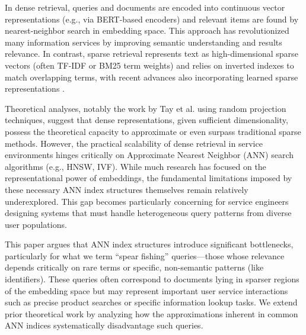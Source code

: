 \documentclass[conference,anonymous]{IEEEtran}
\begin{document}
In dense retrieval, queries and documents are encoded into continuous vector representations (e.g., via BERT-based encoders) and relevant items are found by nearest-neighbor search in embedding space. This approach has revolutionized many information services by improving semantic understanding and results relevance. In contrast, sparse retrieval represents text as high-dimensional sparse vectors (often TF-IDF or BM25 term weights) and relies on inverted indexes to match overlapping terms, with recent advances also incorporating learned sparse representations \cite{formal2021splade}.

Theoretical analyses, notably the work by Tay et al. \cite{tay2020sparse} using random projection techniques, suggest that dense representations, given sufficient dimensionality, possess the theoretical capacity to approximate or even surpass traditional sparse methods. However, the practical scalability of dense retrieval in service environments hinges critically on Approximate Nearest Neighbor (ANN) search algorithms (e.g., HNSW, IVF). While much research has focused on the representational power of embeddings, the fundamental limitations imposed by these necessary ANN index structures themselves remain relatively underexplored. This gap becomes particularly concerning for service engineers designing systems that must handle heterogeneous query patterns from diverse user populations.

This paper argues that ANN index structures introduce significant bottlenecks, particularly for what we term ``spear fishing'' queries—those whose relevance depends critically on rare terms or specific, non-semantic patterns (like identifiers). These queries often correspond to documents lying in sparser regions of the embedding space but may represent important user service interactions such as precise product searches or specific information lookup tasks. We extend prior theoretical work \cite{tay2020sparse, fan2022information} by analyzing how the approximations inherent in common ANN indices systematically disadvantage such queries.
\end{document}
